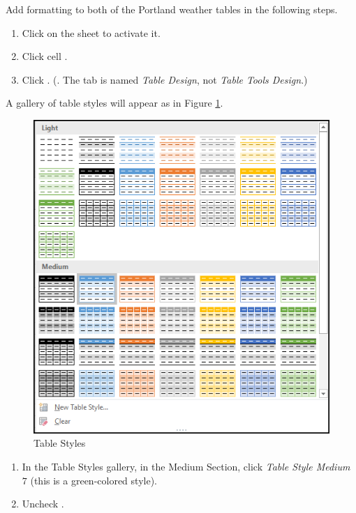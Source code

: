 Add formatting to both of the Portland weather tables in the following steps.

\begin{enumerate}
	\item Click on the  sheet to activate it.
	\item Click cell .
	\item Click . (. The tab is named \textit{Table Design}, not \textit{Table Tools Design}.)
\end{enumerate}

A gallery of table styles will appear as in Figure \ref{05:fig04}.

\begin{figure}[H]
	\centering
	\includegraphics[width=\maxwidth{.75\linewidth}]{gfx/ch05_fig04}
	\caption{Table Styles}
	\label{05:fig04}
\end{figure}

\begin{enumerate}[resume]
	\item In the Table Styles gallery, in the Medium Section, click \textit{Table Style Medium} $ 7 $ (this is a green-colored style).
	\item Uncheck .
\end{enumerate}

